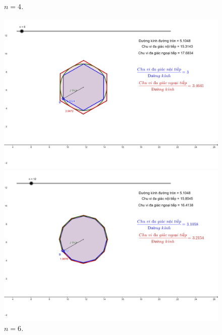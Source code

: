 \begin{multicols}{2}
\begin{figure}[H]
	\caption{\small\textit{\color{lichsutoanhoc}$n = 4$.}}
	\end{figure}
	\begin{figure}[H]
		\vspace*{-5pt}
		\centering
		\captionsetup{labelformat= empty, justification=centering}
		\includegraphics[width= 1\linewidth]{12}
		\caption{\small\textit{\color{lichsutoanhoc}$n = 6$.}}
		\includegraphics[width= 1\linewidth]{13}

\end{figure}
\end{multicols}
